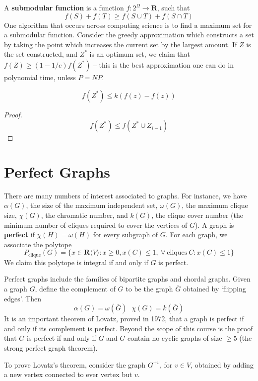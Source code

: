 A {\bf submodular function} is a function $f:2^\Omega \to \mathbf{R}$, such that
%
\[ f(S) + f(T) \geq f(S \cup T) + f(S \cap T) \]
%
One algorithm that occurs across computing science is to find a maximum set for a submodular function. Consider the greedy approximation which constructs a set by taking the point which increases the current set by the largest amount. If $Z$ is the set constructed, and $Z^*$ is an optimum set, we claim that $f(Z) \geq (1 - 1/e) f(Z^*)$ -- this is the best approximation one can do in polynomial time, unless $P = NP$.

\begin{lemma}
    \[ f(Z^*) \leq k (f(z) - f(z)) \]
\end{lemma}
\begin{proof}
    \[ f(Z^*) \leq f(Z^* \cup Z_{i-1}) \]
\end{proof}

\chapter{Perfect Graphs}

There are many numbers of interest associated to graphs. For instance, we have $\alpha(G)$, the size of the maximum independent set, $\omega(G)$, the maximum clique size, $\chi(G)$, the chromatic number, and $k(G)$, the clique cover number (the minimum number of cliques required to cover the vertices of $G$). A graph is {\bf perfect} if $\chi(H) = \omega(H)$ for every subgraph of $G$. For each graph, we associate the polytope
%
\[ P_{\text{clique}}(G) = \{ x \in \mathbf{R} \langle V \rangle : x \geq 0, x(C) \leq 1,\ \forall\ \text{cliques}\ C: x(C) \leq 1 \} \]
%
We claim this polytope is integral if and only if $G$ is perfect.

Perfect graphs include the families of bipartite graphs and chordal graphs. Given a graph $G$, define the complement of $G$ to be the graph $\overline{G}$ obtained by `flipping edges'. Then
%
\[ \alpha(G) = \omega(\overline{G})\ \ \ \chi(G) = k(\overline{G}) \]
%
It is an important theorem of Lovatz, proved in 1972, that a graph is perfect if and only if its complement is perfect. Beyond the scope of this course is the proof that $G$ is perfect if and only if $G$ and $\overline{G}$ contain no cyclic graphs of size $\geq 5$ (the strong perfect graph theorem).

To prove Lovatz's theorem, consider the graph $G^{+v}$, for $v \in V$, obtained by adding a new vertex connected to ever vertex but $v$.

